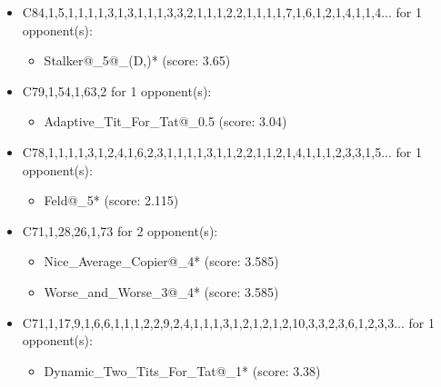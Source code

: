 \begin{appendices}
\begin{itemize}
    \item C84,1,5,1,1,1,1,3,1,3,1,1,1,3,3,2,1,1,1,2,2,1,1,1,1,7,1,6,1,2,1,4,1,1,4... for 1 opponent(s):
    \begin{multicols}{3}
         \begin{itemize}
            \item Stalker@\_5@\_(D,)* (score: 3.65)
        \end{itemize}
     \end{multicols}
     
    \item C79,1,54,1,63,2 for 1 opponent(s):
    \begin{multicols}{3}
         \begin{itemize}
            \item Adaptive\_Tit\_For\_Tat@\_0.5 (score: 3.04)
        \end{itemize}
     \end{multicols}
     
    \item C78,1,1,1,1,3,1,2,4,1,6,2,3,1,1,1,1,3,1,1,2,2,1,1,2,1,4,1,1,1,2,3,3,1,5... for 1 opponent(s):
    \begin{multicols}{3}
         \begin{itemize}
            \item Feld@\_5* (score: 2.115)
        \end{itemize}
     \end{multicols}
     
    \item C71,1,28,26,1,73 for 2 opponent(s):
    \begin{multicols}{3}
         \begin{itemize}
            \item Nice\_Average\_Copier@\_4* (score: 3.585)
            \item Worse\_and\_Worse\_3@\_4* (score: 3.585)
        \end{itemize}
     \end{multicols}
     
    \item C71,1,17,9,1,6,6,1,1,1,2,2,9,2,4,1,1,1,3,1,2,1,2,1,2,10,3,3,2,3,6,1,2,3,3... for 1 opponent(s):
    \begin{multicols}{3}
         \begin{itemize}
            \item Dynamic\_Two\_Tits\_For\_Tat@\_1* (score: 3.38)
        \end{itemize}
     \end{multicols}
     

\end{itemize}
\end{appendices}
